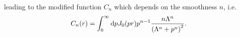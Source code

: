 leading to the modified function $C_n$ which depends on the smoothness $n$, i.e.
\begin{align}
    C_n(r)
    =
    \int_{0}^\infty\mathrm d p J_0(p r)p^{n-1}\frac{n\Lambda^n}{\left(\Lambda^n+p^n\right)^2}.
    \label{eq:rg_cn_def}
\end{align}
\begin{figure}
    \centering

\end{figure}
